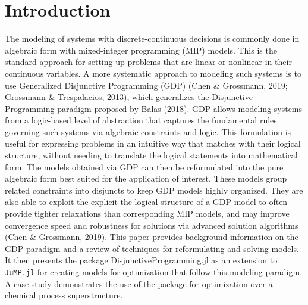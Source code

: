 \documentclass{juliacon}
\begin{document}
\section{Introduction}
The modeling of systems with discrete-continuous decisions is commonly done in algebraic form with mixed-integer programming (MIP) models. This is the standard approach for setting up problems that are linear or nonlinear in their continuous variables.
\vskip 6pt
A more systematic approach to modeling such systems is to use Generalized Disjunctive Programming (GDP) (Chen \& Grossmann, 2019; Grossmann \& Trespalacios, 2013), which generalizes the Disjunctive Programming paradigm proposed by Balas (2018). GDP allows modeling systems from a logic-based level of abstraction that captures the fundamental rules governing such systems via algebraic constraints and logic. This formulation is useful for expressing problems in an intuitive way that matches with their logical structure, without needing to translate the logical statements into mathematical form. 
\vskip 6pt
The models obtained via GDP can then be reformulated into the pure algebraic form best suited for the application of interest. These models group related constraints into disjuncts to keep GDP models highly organized. They are also able to exploit the explicit the logical structure of a GDP model to often provide tighter relaxations than corresponding MIP models, and may improve convergence speed and robustness for solutions via advanced solution algorithms (Chen \& Grossmann, 2019).
\vskip 6pt
This paper provides background information on the GDP paradigm and a review of techniques for reformulating and solving models. It then presents the package DisjunctiveProgramming.jl as an extension to \verb|JuMP.jl| for creating models for optimization that follow this modeling paradigm. A case study demonstrates the use of the package for optimization over a chemical process superstructure.
\end{document}
